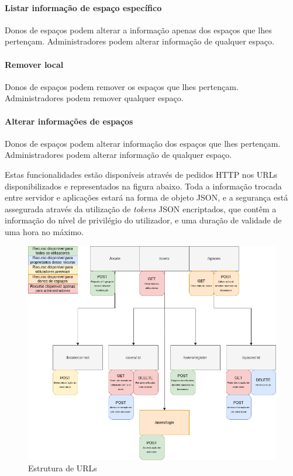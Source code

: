 \documentclass[12pt]{article} %
\begin{document}
\paragraph{Listar informação de espaço específico}
Donos de espaços podem alterar a informação apenas dos espaços que lhes pertençam. Administradores podem alterar informação de qualquer espaço.\par

\paragraph{Remover local}
Donos de espaços podem remover os espaços que lhes pertençam. Administradores podem remover qualquer espaço.\par

\paragraph{Alterar informações de espaços}
Donos de espaços podem alterar informação dos espaços que lhes pertençam. Administradores podem alterar informação de qualquer espaço.\par

Estas funcionalidades estão disponíveis através de pedidos HTTP nos URLs disponibilizados e representados na figura abaixo. Toda a informação trocada entre servidor e aplicações estará na forma de objeto JSON, e a segurança está assegurada através da utilização de \textit{tokens} JSON encriptados, que contêm a informação do nível de privilégio do utilizador, e uma duração de validade de uma hora no máximo.

\begin{figure}[!htbp]
		\includegraphics[width=17cm]{webservicestructurev3.png}
		\centering
		\caption{Estrutura de URLs}

	\end{figure}
\end{document}
